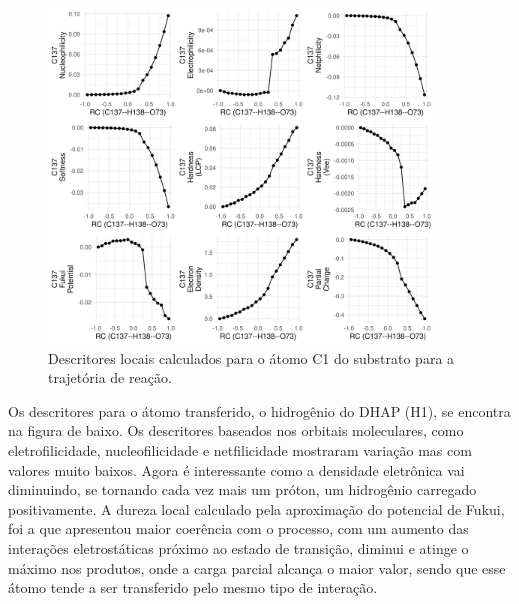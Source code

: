\documentclass[a4paper,11pt]{refart}
\begin{document}
	 \hspace*{-\leftmarginwidth}
	 \begin{minipage}{\fullwidth}
	 	\begin{figure}[H]
	 		\begin{center}
	 			\includegraphics[width=4in]{la_1}
	 			\caption{Descritores locais calculados para o átomo C1 do substrato para a trajetória de reação.}
	 			\label{fig_tut5_5}
	 		\end{center}
	 	\end{figure}
	 \end{minipage}
	 
	 Os descritores para o átomo transferido, o hidrogênio do DHAP (H1), se encontra na figura de baixo. Os descritores baseados nos orbitais moleculares, como eletrofilicidade, nucleofilicidade e netfilicidade mostraram variação mas com valores muito baixos. Agora é interessante como a densidade eletrônica vai diminuindo, se tornando cada vez mais um próton, um hidrogênio carregado positivamente. A dureza local calculado pela aproximação do potencial de Fukui, foi a que apresentou maior coerência com o processo, com um aumento das interações eletrostáticas próximo ao estado de transição, diminui e atinge o máximo nos produtos, onde a carga parcial alcança o maior valor, sendo que esse átomo tende a ser transferido pelo mesmo tipo de interação.
	 
\end{document}
